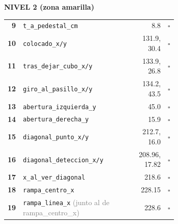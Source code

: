 \documentclass[9pt]{extarticle}
\begin{document}
\begin{minipage}[t]{0.245\linewidth}\tiny
{\small\bfseries\color{orange!85!black} NIVEL 2 (zona amarilla)}\par
\begin{tabular}{@{}r@{\,}>{\raggedright\arraybackslash}p{0.66\linewidth}r@{\,}l@{}}
\textbf{9} & \texttt{t\_\allowbreak{}a\_\allowbreak{}pedestal\_\allowbreak{}cm} & 8.8 & $\square$ \\
\textbf{10} & \texttt{colocado\_\allowbreak{}x/y} & 131.9, 30.4 & $\square$ \\
\textbf{11} & \texttt{tras\_\allowbreak{}dejar\_\allowbreak{}cubo\_\allowbreak{}x/y} & 133.9, 26.8 & $\square$ \\
\textbf{12} & \texttt{giro\_\allowbreak{}al\_\allowbreak{}pasillo\_\allowbreak{}x/y} & 134.2, 43.5 & $\square$ \\
\textbf{13} & \texttt{abertura\_\allowbreak{}izquierda\_\allowbreak{}y} & 45.0 & $\square$ \\
\textbf{14} & \texttt{abertura\_\allowbreak{}derecha\_\allowbreak{}y} & 15.9 & $\square$ \\
\textbf{15} & \texttt{diagonal\_\allowbreak{}punto\_\allowbreak{}x/y} & 212.7, 16.0 & $\square$ \\
\textbf{16} & \texttt{diagonal\_\allowbreak{}deteccion\_\allowbreak{}x/y} & 208.96, 17.82 & $\square$ \\
\textbf{17} & \texttt{x\_\allowbreak{}al\_\allowbreak{}ver\_\allowbreak{}diagonal} & 218.6 & $\square$ \\
\textbf{18} & \texttt{rampa\_\allowbreak{}centro\_\allowbreak{}x} & 228.15 & $\square$ \\
\textbf{19} & \texttt{rampa\_\allowbreak{}linea\_\allowbreak{}x} \textcolor{gray}{(junto al de rampa\_centro\_x)} & 228.6 & $\square$ \\
\end{tabular}\end{minipage}\hfill
\end{document}

